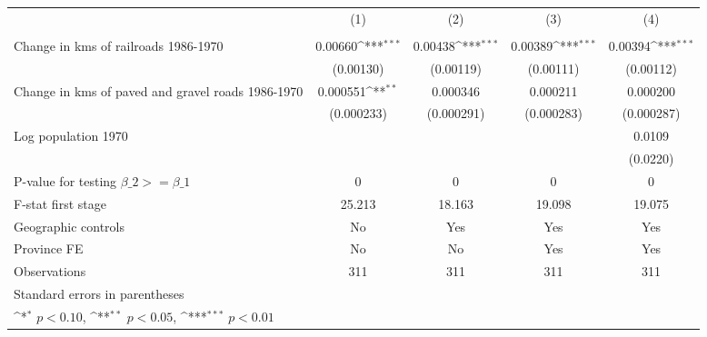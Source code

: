 {
\def\sym#1{\ifmmode^{#1}\else\(^{#1}\)\fi}
\begin{tabular}{l*{4}{c}}
\hline\hline
                &\multicolumn{1}{c}{(1)}&\multicolumn{1}{c}{(2)}&\multicolumn{1}{c}{(3)}&\multicolumn{1}{c}{(4)}\\
                &\multicolumn{1}{c}{}&\multicolumn{1}{c}{}&\multicolumn{1}{c}{}&\multicolumn{1}{c}{}\\
\hline
Change in kms of railroads 1986-1970&  0.00660\sym{***}&  0.00438\sym{***}&  0.00389\sym{***}&  0.00394\sym{***}\\
                &(0.00130)         &(0.00119)         &(0.00111)         &(0.00112)         \\
[1em]
Change in kms of paved and gravel roads 1986-1970& 0.000551\sym{**} & 0.000346         & 0.000211         & 0.000200         \\
                &(0.000233)         &(0.000291)         &(0.000283)         &(0.000287)         \\
[1em]
Log population 1970&                  &                  &                  &   0.0109         \\
                &                  &                  &                  & (0.0220)         \\
\hline
P-value for testing $\beta\_{2} >= \beta\_{1}$&        0         &        0         &        0         &        0         \\
F-stat first stage&   25.213         &   18.163         &   19.098         &   19.075         \\
Geographic controls&       No         &      Yes         &      Yes         &      Yes         \\
Province FE     &       No         &       No         &      Yes         &      Yes         \\
Observations    &      311         &      311         &      311         &      311         \\
\hline\hline
\multicolumn{5}{l}{\footnotesize Standard errors in parentheses}\\
\multicolumn{5}{l}{\footnotesize \sym{*} \(p<0.10\), \sym{**} \(p<0.05\), \sym{***} \(p<0.01\)}\\
\end{tabular}
}
